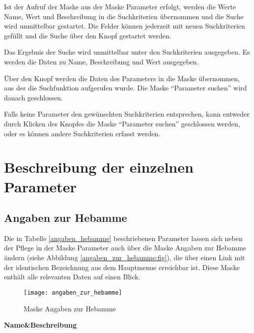 Ist der Aufruf der Maske aus der Maske Parameter
erfolgt, werden die Werte Name, Wert und Beschreibung
in die Suchkriterien übernommen und die Suche wird unmittelbar gestartet.
Die Felder können jederzeit mit neuen Suchkriterien gefüllt und die Suche
über den Knopf  gestartet werden.

Das Ergebnis der Suche wird unmittelbar unter den Suchkriterien ausgegeben.
Es werden die Daten zu Name, Beschreibung und Wert ausgegeben.

Über den Knopf  werden die Daten des Parameters in die Maske
übernommen, aus der die Suchfunktion aufgerufen wurde. Die Maske
``Parameter suchen''
wird danach geschlossen.

Falls keine Parameter den gewünschten Suchkriterien entsprechen, kann entweder
durch Klicken des Knopfes  die Maske ``Parameter suchen''
geschlossen werden, oder es können andere Suchkriterien erfasst werden.

\section{Beschreibung der einzelnen Parameter}

\subsection{Angaben zur Hebamme\label{parm:heb:abs}}
Die in Tabelle \vref{angaben_hebamme} beschriebenen Parameter lassen 
sich neben der Pflege in der Maske Parameter auch über die Maske
Angaben zur Hebamme ändern (siehe Abbildung \vref{angaben_zur_hebamme:fig}),
die über einen Link mit der identischen
Bezeichnung aus dem Hauptmenue erreichbar ist. Diese Maske enthält
alle relevanten Daten auf einen Blick.

\begin{figure}[H]
\centering
\texttt{[image: angaben\_zur\_hebamme]}
\caption{Maske Angaben zur Hebamme\label{angaben_zur_hebamme:fig}}
\end{figure}


\tablehead
{\hline \bfseries Name&\bfseries Beschreibung\\ \hline}

\tabletail
{\hline {}\\}

